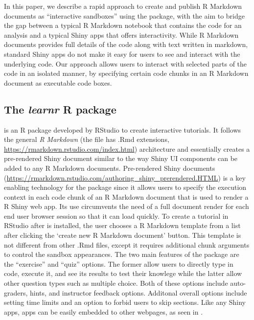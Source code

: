 In this paper, we describe a rapid approach to create and publish R
Markdown documents as ``interactive sandboxes'' using the
 package, with the aim to bridge the gap between a
typical R Markdown notebook that contains the code for an analysis and a
typical Shiny apps that offers interactivity. While R Markdown documents
provides full details of the code along with text written in markdown,
standard Shiny apps do not make it easy for users to see and interact
with the underlying code. Our approach allows users to interact with
selected parts of the code in an isolated manner, by specifying certain
code chunks in an R Markdown document as executable code boxes.

\hypertarget{the-learnr-r-package}{%
\subsection{\texorpdfstring{The \emph{learnr} R
package}{The learnr R package}}\label{the-learnr-r-package}}

 \citep{learnr} is an R package developed by RStudio to
create interactive tutorials. It follows the general \emph{R Markdown}
(the file has .Rmd extensions,
\url{https://rmarkdown.rstudio.com/index.html}) architecture and
essentially creates a pre-rendered Shiny document similar to the way
Shiny UI components can be added to any R Markdown documents.
Pre-rendered Shiny documents
(\url{https://rmarkdown.rstudio.com/authoring_shiny_prerendered.HTML})
is a key enabling technology for the  package since it
allows users to specify the execution context in each code chunk of an R
Markdown document that is used to render a R Shiny web app. Its use
circumvents the need of a full document render for each end user browser
session so that it can load quickly. To create a 
tutorial in RStudio after  is installed, the user
chooses a  R Markdown template from a list after
clicking the `create new R Markdown document' button. This template is
not different from other .Rmd files, except it requires additional chunk
arguments to control the sandbox appearances. The two main features of
the  package are the ``exercise'' and ``quiz'' options.
The former allow users to directly type in code, execute it, and see its
results to test their knowlege while the latter allow other question
types such as multiple choice. Both of these options include
auto-graders, hints, and instructor feedback options. Additonal overall
options include setting time limits and an option to forbid users to
skip sections. Like any Shiny apps,  apps can be easily
embedded to other webpages, as seen in \citet{rmrwr}.

